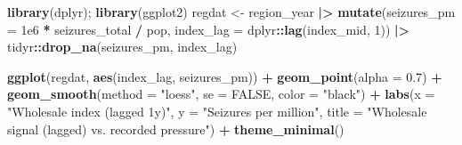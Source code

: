 \documentclass[
]{article}
\newenvironment{Shaded}{\begin{snugshade}}{\end{snugshade}}
\newcommand{\AttributeTok}[1]{\textcolor[rgb]{0.13,0.29,0.53}{#1}}
\newcommand{\ConstantTok}[1]{\textcolor[rgb]{0.56,0.35,0.01}{#1}}
\newcommand{\DecValTok}[1]{\textcolor[rgb]{0.00,0.00,0.81}{#1}}
\newcommand{\FloatTok}[1]{\textcolor[rgb]{0.00,0.00,0.81}{#1}}
\newcommand{\FunctionTok}[1]{\textcolor[rgb]{0.13,0.29,0.53}{\textbf{#1}}}
\newcommand{\NormalTok}[1]{#1}
\newcommand{\OtherTok}[1]{\textcolor[rgb]{0.56,0.35,0.01}{#1}}
\newcommand{\SpecialCharTok}[1]{\textcolor[rgb]{0.81,0.36,0.00}{\textbf{#1}}}
\newcommand{\StringTok}[1]{\textcolor[rgb]{0.31,0.60,0.02}{#1}}
\begin{document}
\begin{Shaded}
\begin{Highlighting}[]
\FunctionTok{library}\NormalTok{(dplyr); }\FunctionTok{library}\NormalTok{(ggplot2)}
\NormalTok{regdat }\OtherTok{\textless{}{-}}\NormalTok{ region\_year }\SpecialCharTok{|\textgreater{}}
  \FunctionTok{mutate}\NormalTok{(}\AttributeTok{seizures\_pm =} \FloatTok{1e6} \SpecialCharTok{*}\NormalTok{ seizures\_total }\SpecialCharTok{/}\NormalTok{ pop,}
         \AttributeTok{index\_lag   =}\NormalTok{ dplyr}\SpecialCharTok{::}\FunctionTok{lag}\NormalTok{(index\_mid, }\DecValTok{1}\NormalTok{)) }\SpecialCharTok{|\textgreater{}}
\NormalTok{  tidyr}\SpecialCharTok{::}\FunctionTok{drop\_na}\NormalTok{(seizures\_pm, index\_lag)}

\FunctionTok{ggplot}\NormalTok{(regdat, }\FunctionTok{aes}\NormalTok{(index\_lag, seizures\_pm)) }\SpecialCharTok{+}
  \FunctionTok{geom\_point}\NormalTok{(}\AttributeTok{alpha =} \FloatTok{0.7}\NormalTok{) }\SpecialCharTok{+}
  \FunctionTok{geom\_smooth}\NormalTok{(}\AttributeTok{method =} \StringTok{"loess"}\NormalTok{, }\AttributeTok{se =} \ConstantTok{FALSE}\NormalTok{, }\AttributeTok{color =} \StringTok{"black"}\NormalTok{) }\SpecialCharTok{+}
  \FunctionTok{labs}\NormalTok{(}\AttributeTok{x =} \StringTok{"Wholesale index (lagged 1y)"}\NormalTok{, }\AttributeTok{y =} \StringTok{"Seizures per million"}\NormalTok{,}
       \AttributeTok{title =} \StringTok{"Wholesale signal (lagged) vs. recorded pressure"}\NormalTok{) }\SpecialCharTok{+}
  \FunctionTok{theme\_minimal}\NormalTok{()}
\end{Highlighting}
\end{Shaded}
\end{document}
